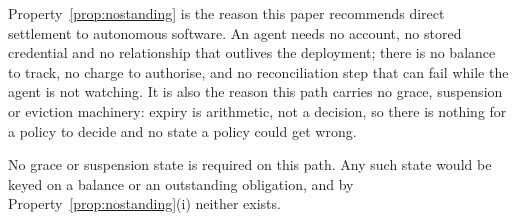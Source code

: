 Property~\ref{prop:nostanding} is the reason this paper recommends direct settlement to autonomous
software. An agent needs no account, no stored credential and no relationship that outlives the
deployment; there is no balance to track, no charge to authorise, and no reconciliation step that can
fail while the agent is not watching. It is also the reason this path carries no grace, suspension or
eviction machinery: expiry is arithmetic, not a decision, so there is nothing for a policy to decide
and no state a policy could get wrong.

\begin{corollary}
\label{cor:noeviction}
No grace or suspension state is required on this path. Any such state would be keyed on a balance
or an outstanding obligation, and by Property~\ref{prop:nostanding}(i) neither exists.
\end{corollary}

